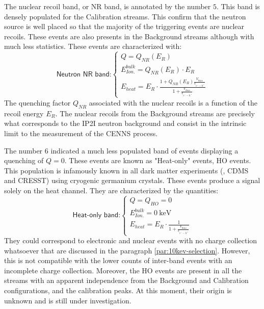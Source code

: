 The nuclear recoil band, or NR band, is annotated by the number $5$. This band is densely populated for the Calibration streams. This confirm that the neutron source is well placed so that the majority of the triggering events are nuclear recoils. These events are also presents in the Background streams although with much less statistics. These events are characterized with:
\begin{equation}
\label{eq:nr-band}
\textsf{Neutron NR band:}
\begin{cases}
Q = Q_{NR} \left( E_R \right) \\
E_{Ion.}^{bulk} = Q_{NR}\left( E_R \right) \cdot E_R \\
E_{heat} 
=
E_R 
\cdot
\frac{
1 + Q_{NR} \left( E_R \right)\frac{V_{bias}}{\epsilon_{e^--h^+}}
}{
1 + \frac{V_{bias}}{\epsilon_{e^--h^+}}
}
\end{cases}
\end{equation}
The quenching factor $Q_{NR}$ associated with the nuclear recoils is a function of the recoil energy $E_R$.
The nuclear recoils from the Background streams are precisely what corresponds to the IP2I neutron background and consist in the intrinsic limit to the measurement of the CENNS process.

The number $6$ indicated a much less populated band of events displaying a quenching of $Q=0$. These events are known as "Heat-only" events, HO events. This population is infamously known in all dark matter experiments (\Edelweiss{}, CDMS and CRESST) using cryogenic germanium crystals. These events produce a signal solely on the heat channel. They are characterized by the quantities:
\begin{equation}
\label{eq:ho-band}
\textsf{Heat-only band:}
\begin{cases}
Q = Q_{HO} = 0 \\
E_{Ion.}^{bulk} = \SI{0}{\kilo\eV}\\
E_{heat} 
=
E_R 
\cdot
\frac{
1
}{
1 + \frac{V_{bias}}{\epsilon_{e^--h^+}}
}
\end{cases}
\end{equation}
They could correspond to electronic and nuclear events with no charge collection whatsoever that are discussed in the paragraph \ref{par:10kev-selection}. However, this is not compatible with the lower counts of inter-band events with an incomplete charge collection. Moreover, the HO events are present in all the streams with an apparent independence from the Background and Calibration configurations, and the calibration peaks.
At this moment, their origin is unknown and is still under investigation.

